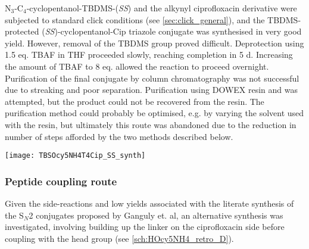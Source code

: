 N$_3$-C$_4$-cyclopentanol-TBDMS-(\textit{SS})  and the alkynyl ciprofloxacin derivative  were subjected to standard click conditions (see \ref{sec:click_general}), and the TBDMS-protected (\textit{SS})-cyclopentanol-Cip triazole conjugate  was synthesised in very good yield. However, removal of the TBDMS group proved difficult. Deprotection using 1.5 eq. TBAF in THF proceeded slowly, reaching completion in 5 d. Increasing the amount of TBAF to 8 eq. allowed the reaction to proceed overnight.
Purification of the final conjugate  by column chromatography was not successful due to streaking and poor separation. Purification using DOWEX resin and  was attempted, but the product could not be recovered from the resin.
The purification method could probably be optimised, e.g. by varying the solvent used with the resin, but ultimately this route was abandoned due to the reduction in number of steps afforded by the two methods described below.

\begin{scheme}[H]
	\begin{center}
		\texttt{[image: TBSOcy5NH4T4Cip\_SS\_synth]}
		\caption{
		a) , sodium ascorbate, THPTA, , \textit{t}-BuOH, r.t., 87.4 \%. %
		b) TBAF, THF, r.t., 16 h. %
		\label{sch:TBSOcy5NH4T4Cip_SS_synth}}
	\end{center}
\end{scheme}

\subsubsection{Peptide coupling route\label{sec:CipMe_linker}}

Given the side-reactions and low yields associated with the literate synthesis of the S$_N$2 conjugates proposed by Ganguly et. al\cite{Ganguly2011}, an alternative synthesis was investigated, involving building up the linker on the ciprofloxacin side before coupling with the head group (see \ref{sch:HOcy5NH4_retro_D}).


